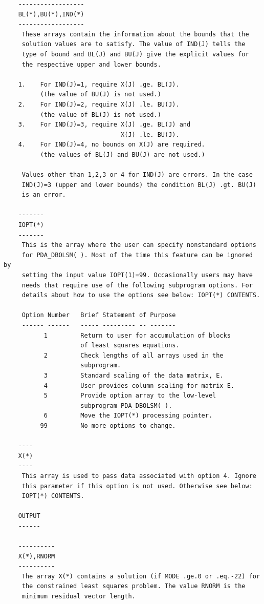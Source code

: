 \documentclass[11pt,twoside]{article}
\begin{document}
\begin{verbatim}
    ------------------
    BL(*),BU(*),IND(*)
    ------------------
     These arrays contain the information about the bounds that the
     solution values are to satisfy. The value of IND(J) tells the
     type of bound and BL(J) and BU(J) give the explicit values for
     the respective upper and lower bounds.

    1.    For IND(J)=1, require X(J) .ge. BL(J).
          (the value of BU(J) is not used.)
    2.    For IND(J)=2, require X(J) .le. BU(J).
          (the value of BL(J) is not used.)
    3.    For IND(J)=3, require X(J) .ge. BL(J) and
                                X(J) .le. BU(J).
    4.    For IND(J)=4, no bounds on X(J) are required.
          (the values of BL(J) and BU(J) are not used.)

     Values other than 1,2,3 or 4 for IND(J) are errors. In the case
     IND(J)=3 (upper and lower bounds) the condition BL(J) .gt. BU(J)
     is an error.

    -------
    IOPT(*)
    -------
     This is the array where the user can specify nonstandard options
     for PDA_DBOLSM( ). Most of the time this feature can be ignored by
     setting the input value IOPT(1)=99. Occasionally users may have
     needs that require use of the following subprogram options. For
     details about how to use the options see below: IOPT(*) CONTENTS.

     Option Number   Brief Statement of Purpose
     ------ ------   ----- --------- -- -------
           1         Return to user for accumulation of blocks
                     of least squares equations.
           2         Check lengths of all arrays used in the
                     subprogram.
           3         Standard scaling of the data matrix, E.
           4         User provides column scaling for matrix E.
           5         Provide option array to the low-level
                     subprogram PDA_DBOLSM( ).
           6         Move the IOPT(*) processing pointer.
          99         No more options to change.

    ----
    X(*)
    ----
     This array is used to pass data associated with option 4. Ignore
     this parameter if this option is not used. Otherwise see below:
     IOPT(*) CONTENTS.

    OUTPUT
    ------

    ----------
    X(*),RNORM
    ----------
     The array X(*) contains a solution (if MODE .ge.0 or .eq.-22) for
     the constrained least squares problem. The value RNORM is the
     minimum residual vector length.


\end{verbatim}
\end{document}
